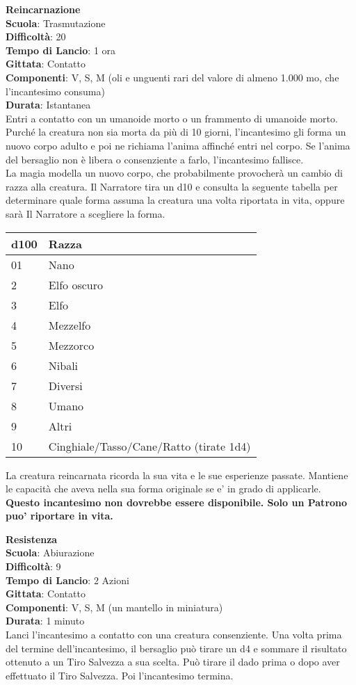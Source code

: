\begin{multicols}{2}
\medskip\textbf{Reincarnazione}\\
\textbf{Scuola}: Trasmutazione\\
\textbf{Difficoltà}:  20\\
\textbf{Tempo di Lancio}: 1 ora\\
\textbf{Gittata}: Contatto\\
\textbf{Componenti}: V, S, M (oli e unguenti rari del valore di almeno 1.000 mo, che l'incantesimo consuma)\\
\textbf{Durata}: Istantanea\\
Entri a contatto con un umanoide morto o un frammento di umanoide morto. Purché la creatura non sia morta da più di 10 giorni, l'incantesimo gli forma un nuovo corpo adulto e poi ne richiama l’anima affinché entri nel corpo. Se l’anima del bersaglio non è libera o consenziente a farlo, l'incantesimo fallisce.\\
La magia modella un nuovo corpo, che probabilmente provocherà un cambio di razza alla creatura. Il Narratore tira un d10 e consulta la seguente tabella per determinare quale forma assuma la creatura una volta riportata in vita, oppure sarà Il Narratore a scegliere la forma.\\
\medskip
\begin{tabular}{ll}
\textbf{d100} &\textbf{Razza}\\
\toprule
01&Nano\\
2&Elfo oscuro\\
3&Elfo\\
4&Mezzelfo\\
5&Mezzorco\\
6&Nibali\\
7&Diversi\\
8&Umano\\
9&Altri\\
10&Cinghiale/Tasso/Cane/Ratto (tirate 1d4)\\
\end{tabular}

La creatura reincarnata ricorda la sua vita e le sue esperienze passate. Mantiene le capacità che aveva nella sua forma originale se e' in grado di applicarle.\\
\textbf{Questo incantesimo non dovrebbe essere disponibile. Solo un Patrono puo' riportare in vita.}

\medskip\textbf{Resistenza}\\
\textbf{Scuola}: Abiurazione\\
\textbf{Difficoltà}:  9\\
\textbf{Tempo di Lancio}: 2 Azioni\\
\textbf{Gittata}: Contatto\\
\textbf{Componenti}: V, S, M (un mantello in miniatura)\\
\textbf{Durata}: 1 minuto\\
Lanci l'incantesimo a contatto con una creatura consenziente. Una volta prima del termine dell'incantesimo, il bersaglio può tirare un d4 e sommare il risultato ottenuto a un Tiro Salvezza a  sua scelta. Può tirare il dado prima o dopo aver effettuato il Tiro Salvezza. Poi l'incantesimo termina.


\end{multicols}
